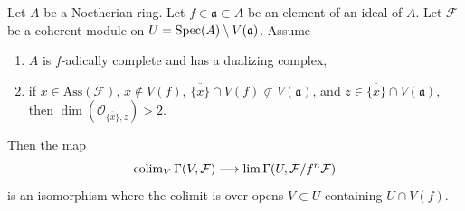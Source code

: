 \begin{proposition}
\label{proposition-alternative-colim-H0}
Let $A$ be a Noetherian ring. Let $f \in \mathfrak a \subset A$
be an element of an ideal of $A$. Let $\mathcal{F}$ be a coherent
module on $U = \mathop{\mathrm{Spec}}(A) \setminus V(\mathfrak a)$. Assume
\begin{enumerate}
\item $A$ is $f$-adically complete and has a dualizing complex,
\item if $x \in \text{Ass}(\mathcal{F})$, $x \not \in V(f)$,
$\overline{\{x\}} \cap V(f) \not \subset V(\mathfrak a)$,
and $z \in \overline{\{x\}} \cap V(\mathfrak a)$, then
$\dim(\mathcal{O}_{\overline{\{x\}}, z}) > 2$.
\end{enumerate}
Then the map
$$
\mathop{\mathrm{colim}}\nolimits_V \Gamma(V, \mathcal{F})
\longrightarrow
\mathop{\mathrm{lim}}\nolimits \Gamma(U, \mathcal{F}/f^n\mathcal{F})
$$
is an isomorphism where the colimit is over opens $V \subset U$
containing $U \cap V(f)$.
\end{proposition}

